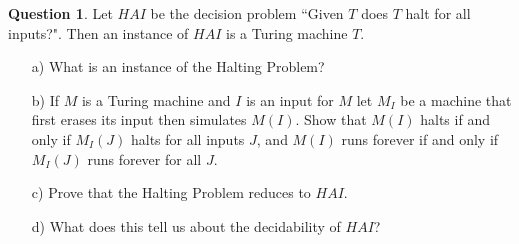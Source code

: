 \documentclass{article}
\theoremstyle{definition}
\newtheorem{Q}{Question}
\begin{document}
\begin{Q}
Let $HAI$ be the decision problem ``Given $T$ does $T$ halt for all inputs?". Then an instance of $HAI$ is a Turing machine $T$. \begin{enumerate}
\item[a)] What is an instance of the Halting Problem?
\item[b)] If $M$ is a Turing machine and $I$ is an input for $M$ let $M_I$ be a machine that first erases its input then simulates $M(I)$. Show that $M(I)$ halts if and only if $M_I(J)$ halts for all inputs $J$, and $M(I)$ runs forever if and only if $M_I(J)$ runs forever for all $J$.
\item[c)] Prove that the Halting Problem reduces to $HAI$.
\item[d)] What does this tell us about the decidability of $HAI$?
\end{enumerate} 
\end{Q}
\begin{comment}
\textbf{Solution}\\
\begin{enumerate}[a)]
\item A pair $(M,I)$ where $M$ is a Turing machine and $I$ is a finite string over its alphabet.
\item By definition $M(I)$ halts if and only if $M_I(J)$ halts for all $J$. So the contrapositive statement says that $M(I)$ runs forever if and only if $M_I(J)$ runs forever for some $J$. But $M_I(J)$ does the same thing for all $J$, so $M(I)$ runs forever if and only if $M_I(J)$ runs forever for all $J$.
\item Given an instance $(M,I)$ of HP we construct an instance $M_I$ of HAI as described. We have just proved that $(M,I)$ is a yes instance of HP if and only if $M_I$ is a yes instance of HAI.
\item As $HP\leq HAI$, and $HP$ is undecidable, it follows that $HAI$ is undecidable.
\end{enumerate}
\end{comment}
\end{document}
